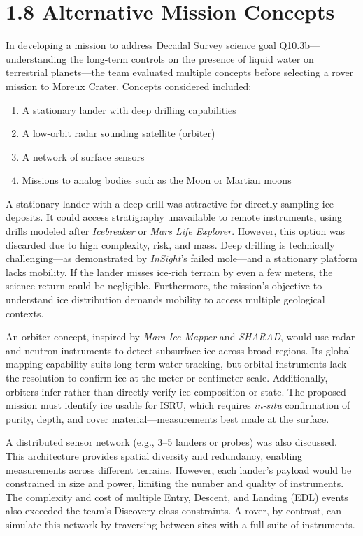 \section*{1.8 Alternative Mission Concepts}

In developing a mission to address Decadal Survey science goal Q10.3b—understanding the long-term controls on the presence of liquid water on terrestrial planets—the team evaluated multiple concepts before selecting a rover mission to Moreux Crater. Concepts considered included: 
\begin{enumerate}
    \item A stationary lander with deep drilling capabilities
    \item A low-orbit radar sounding satellite (orbiter)
    \item A network of surface sensors
    \item Missions to analog bodies such as the Moon or Martian moons
\end{enumerate}

A stationary lander with a deep drill was attractive for directly sampling ice deposits. It could access stratigraphy unavailable to remote instruments, using drills modeled after \textit{Icebreaker} or \textit{Mars Life Explorer}. However, this option was discarded due to high complexity, risk, and mass. Deep drilling is technically challenging—as demonstrated by \textit{InSight}’s failed mole—and a stationary platform lacks mobility. If the lander misses ice-rich terrain by even a few meters, the science return could be negligible. Furthermore, the mission’s objective to understand ice distribution demands mobility to access multiple geological contexts.

An orbiter concept, inspired by \textit{Mars Ice Mapper} and \textit{SHARAD}, would use radar and neutron instruments to detect subsurface ice across broad regions. Its global mapping capability suits long-term water tracking, but orbital instruments lack the resolution to confirm ice at the meter or centimeter scale. Additionally, orbiters infer rather than directly verify ice composition or state. The proposed mission must identify ice usable for ISRU, which requires \textit{in-situ} confirmation of purity, depth, and cover material—measurements best made at the surface.

A distributed sensor network (e.g., 3–5 landers or probes) was also discussed. This architecture provides spatial diversity and redundancy, enabling measurements across different terrains. However, each lander’s payload would be constrained in size and power, limiting the number and quality of instruments. The complexity and cost of multiple Entry, Descent, and Landing (EDL) events also exceeded the team’s Discovery-class constraints. A rover, by contrast, can simulate this network by traversing between sites with a full suite of instruments.

